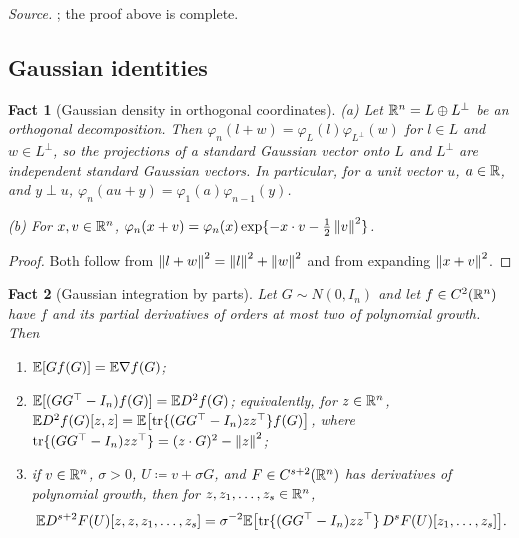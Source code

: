 \documentclass[11pt,letterpaper]{article}
\theoremstyle{plain}
\newtheorem{fact}{Fact}[section]
\begin{document}
\emph{Source.} ; the proof above is complete.

\subsection{Gaussian identities}\label{tb:sec:gauss}

\begin{fact}[Gaussian density in orthogonal coordinates]\label{tb:gauss-coord}
(a) Let \(\mathbb R^n=L\oplus L^\perp\) be an orthogonal decomposition. Then
\(\varphi_n(l+w)=\varphi_L(l)\varphi_{L^\perp}(w)\) for \(l\in L\) and
\(w\in L^\perp\), so the projections of a standard Gaussian vector onto
\(L\) and \(L^\perp\) are independent standard Gaussian vectors. In
particular, for a unit vector \(u\), \(a\in\mathbb R\), and \(y\perp u\),
\(\varphi_n(au+y)=\varphi_1(a)\varphi_{n-1}(y)\).

(b) For \(x,v\in\mathbb R^n\),
\(\varphi_n(x+v)=\varphi_n(x)\exp\{-x\cdot v-\tfrac12\left\lVert v\right\rVert^2\}\).
\end{fact}

\begin{proof}
Both follow from \(\left\lVert l+w\right\rVert^2=\left\lVert l\right\rVert^2+\left\lVert w\right\rVert^2\) and from expanding
\(\left\lVert x+v\right\rVert^2\).
\end{proof}


\begin{fact}[Gaussian integration by parts]\label{tb:stein}
Let \(G\sim N(0,I_n)\) and let \(f\in C^2(\mathbb R^n)\) have \(f\) and its partial
derivatives of orders at most two of polynomial growth. Then
\begin{enumerate}
\item[(a)] \(\mathbb E[Gf(G)]=\mathbb E\nabla f(G)\);
\item[(b)] \(\mathbb E[(GG^\top-I_n)f(G)]=\mathbb E D^2f(G)\); equivalently, for \(z\in\mathbb R^n\),
\(\mathbb E D^2f(G)[z,z]=\mathbb E\bigl[\operatorname{tr}\{(GG^\top-I_n)zz^\top\}f(G)\bigr]\), where
\(\operatorname{tr}\{(GG^\top-I_n)zz^\top\}=(z\cdot G)^2-\left\lVert z\right\rVert^2\);
\item[(c)] if \(v\in\mathbb R^n\), \(\sigma>0\), \(U\coloneqq v+\sigma G\), and
\(F\in C^{s+2}(\mathbb R^n)\) has derivatives of polynomial growth, then for
\(z,z_1,\ldots,z_s\in\mathbb R^n\),
\[
 \mathbb E D^{s+2}F(U)[z,z,z_1,\ldots,z_s]
 =\sigma^{-2}\mathbb E\bigl[\operatorname{tr}\{(GG^\top-I_n)zz^\top\}\,
 D^sF(U)[z_1,\ldots,z_s]\bigr].
\]
\end{enumerate}
\end{fact}
\end{document}
